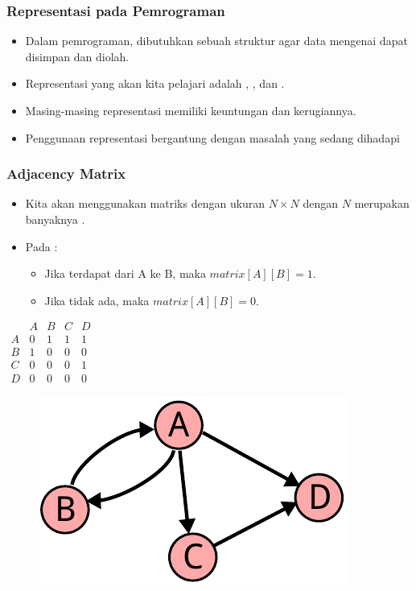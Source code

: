 \begin{frame}
\frametitle{Representasi \fGraph pada Pemrograman}

\begin{itemize}
  \item Dalam pemrograman, dibutuhkan sebuah struktur agar data mengenai \fgraph dapat disimpan dan diolah.
  \item Representasi yang akan kita pelajari adalah \fadjacencymatrix, \fadjacencylist, dan \fadjacencylist.
  \item Masing-masing representasi memiliki keuntungan dan kerugiannya.
  \item Penggunaan representasi \fgraph bergantung dengan masalah yang sedang dihadapi
\end{itemize}
\end{frame}

\begin{frame}
\frametitle{Adjacency Matrix}
\begin{itemize}
  \item Kita akan menggunakan matriks dengan ukuran $N \times N$ dengan $N$ merupakan banyaknya \fnode.
  \item Pada  \fgraph:
  \begin{itemize}
    \item Jika terdapat \fedge dari A ke B, maka $matrix[A][B] = 1$. 
    \item Jika tidak ada, maka $matrix[A][B] = 0$.
  \end{itemize}
\end{itemize}

\begin{center}
\begin{multicols}{2}
  $\begin{array}{c|cccc}
      & A & B & C & D \\ \hline
    A & 0 & 1 & 1 & 1 \\
    B & 1 & 0 & 0 & 0 \\
    C & 0 & 0 & 0 & 1 \\
    D & 0 & 0 & 0 & 0
  \end{array}$
  \break
  \begin{figure}
    \includegraphics[width=4 cm]{asset/unweighted-directed.pdf}
  \end{figure}
\end{multicols} 
\end{center}
\end{frame}

